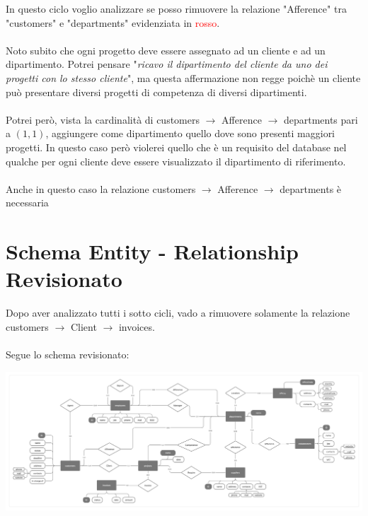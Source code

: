 \documentclass[12pt,a4paper]{article}
\begin{document}
In questo ciclo voglio analizzare se posso rimuovere la relazione "Afference" tra "customers" e "departments" evidenziata in \textcolor{red}{rosso}.\\
\\
Noto subito che ogni progetto deve essere assegnato ad un cliente e ad un dipartimento. Potrei pensare "\textit{ricavo il dipartimento del cliente da uno dei progetti con lo stesso cliente}", ma questa affermazione non regge poichè un cliente può presentare diversi progetti di competenza di diversi dipartimenti.\\
\\
Potrei però, vista la cardinalità di customers $\rightarrow$ Afference $\rightarrow$ departments pari a $(1,1)$, aggiungere come dipartimento quello dove sono presenti maggiori progetti. In questo caso però violerei quello che è un requisito del database nel qualche per ogni cliente deve essere visualizzato il dipartimento di riferimento.\\
\\
Anche in questo caso la relazione customers $\rightarrow$ Afference $\rightarrow$ departments è necessaria

\clearpage
\section{Schema Entity - Relationship Revisionato}\label{sec:schema-entity---relationship-revisionato}
Dopo aver analizzato tutti i sotto cicli, vado a rimuovere solamente la relazione customers $\rightarrow$ Client $\rightarrow$ invoices.\\
\\
Segue lo schema revisionato:
\begin{center}
\includegraphics[width=0.9\columnwidth]{../../img/er_scheme_reviewed}
\end{center}

\end{document}

